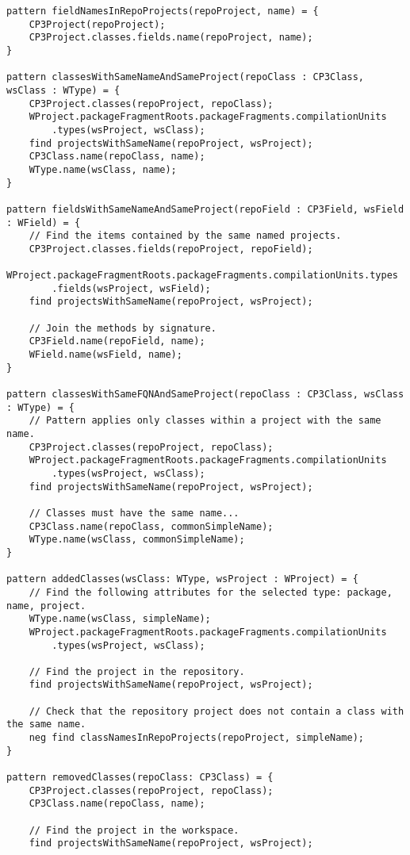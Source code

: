 \begin{lstlisting}
pattern fieldNamesInRepoProjects(repoProject, name) = {
    CP3Project(repoProject);
    CP3Project.classes.fields.name(repoProject, name);
}

pattern classesWithSameNameAndSameProject(repoClass : CP3Class, wsClass : WType) = {
    CP3Project.classes(repoProject, repoClass);
    WProject.packageFragmentRoots.packageFragments.compilationUnits
    	.types(wsProject, wsClass);
    find projectsWithSameName(repoProject, wsProject);
    CP3Class.name(repoClass, name);
    WType.name(wsClass, name);
}

pattern fieldsWithSameNameAndSameProject(repoField : CP3Field, wsField : WField) = {
    // Find the items contained by the same named projects.
    CP3Project.classes.fields(repoProject, repoField);
    WProject.packageFragmentRoots.packageFragments.compilationUnits.types
    	.fields(wsProject, wsField);
    find projectsWithSameName(repoProject, wsProject);

    // Join the methods by signature.
    CP3Field.name(repoField, name);
    WField.name(wsField, name);
}

pattern classesWithSameFQNAndSameProject(repoClass : CP3Class, wsClass : WType) = {
    // Pattern applies only classes within a project with the same name.
    CP3Project.classes(repoProject, repoClass);
    WProject.packageFragmentRoots.packageFragments.compilationUnits
    	.types(wsProject, wsClass);
    find projectsWithSameName(repoProject, wsProject);

    // Classes must have the same name...
    CP3Class.name(repoClass, commonSimpleName);
    WType.name(wsClass, commonSimpleName);
}

pattern addedClasses(wsClass: WType, wsProject : WProject) = {
    // Find the following attributes for the selected type: package, name, project.
    WType.name(wsClass, simpleName);
    WProject.packageFragmentRoots.packageFragments.compilationUnits
    	.types(wsProject, wsClass);

    // Find the project in the repository.
    find projectsWithSameName(repoProject, wsProject);

    // Check that the repository project does not contain a class with the same name.
    neg find classNamesInRepoProjects(repoProject, simpleName);
}

pattern removedClasses(repoClass: CP3Class) = {
    CP3Project.classes(repoProject, repoClass);
    CP3Class.name(repoClass, name);

    // Find the project in the workspace.
    find projectsWithSameName(repoProject, wsProject);


\end{lstlisting}
